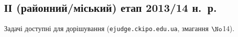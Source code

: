 \documentclass[14pt,a4paper]{extarticle}
\begin{document}
\renewenvironment{problemAllDefault}[1]{\vspace{10mm}\par\begin{problem}{#1}{Клавіатура (stdin)}{Екран (stdout)}{1 сек}{64 мегабайти}}{\end{problem}}

\subsection{ІІ (районний/міський) етап 2013/14 н.~р.}

Задачі доступні для дорішування (\verb"ejudge.ckipo.edu.ua", змагання $\No$14).

\vspace{-0.5\baselineskip minus 1cm}
\end{document}
